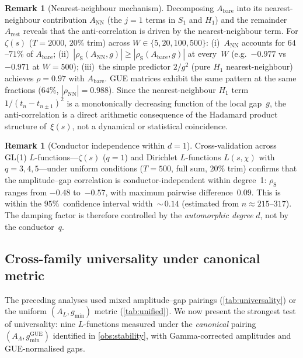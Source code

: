 \documentclass[11pt,a4paper]{article}
\theoremstyle{plain}
\theoremstyle{definition}
\newtheorem{remark}[theorem]{Remark}
\DeclareMathOperator{\GUE}{GUE}
\newcommand{\La}{\Lambda}
\begin{document}
\begin{remark}[Nearest-neighbour mechanism]\label{rem:nn_mechanism}
Decomposing $A_{\mathrm{bare}}$ into its nearest-neighbour contribution
$A_{\mathrm{NN}}$ (the $j{=}1$ terms in $S_1$ and $H_1$) and the
remainder $A_{\mathrm{rest}}$ reveals that the anti-correlation
is driven by the nearest-neighbour term.
For $\zeta(s)$ ($T = 2000$, $20\%$ trim) across
$W \in \{5, 20, 100, 500\}$:
(i)~$A_{\mathrm{NN}}$ accounts for $64$--$71\%$ of $A_{\mathrm{bare}}$;
(ii)~$|\rho_{\mathrm{S}}(A_{\mathrm{NN}}, g)| \ge
|\rho_{\mathrm{S}}(A_{\mathrm{bare}}, g)|$ at every~$W$
(e.g.\ $-0.977$ vs $-0.971$ at $W{=}500$);
(iii)~the simple predictor $2/g^2$ (pure $H_1$ nearest-neighbour)
achieves $\rho = 0.97$ with $A_{\mathrm{bare}}$.
GUE matrices exhibit the same pattern at the same fractions
($64\%$, $|\rho_{\mathrm{NN}}|{=}0.988$).
Since the nearest-neighbour $H_1$ term $1/(t_n{-}t_{n\pm 1})^2$
is a monotonically decreasing function of the local gap~$g$,
the anti-correlation is a direct arithmetic consequence of the
Hadamard product structure of~$\xi(s)$, not a dynamical or
statistical coincidence.
\end{remark}

\begin{remark}[Conductor independence within $d = 1$]\label{rem:conductor_indep}
Cross-validation across GL(1) $L$-functions---$\zeta(s)$
($q = 1$) and Dirichlet $L$-functions $L(s,\chi)$ with
$q = 3, 4, 5$---under uniform conditions
($T = 500$, full sum, $20\%$ trim) confirms that the
amplitude--gap correlation is conductor-independent
within degree~1: $\rho_{\mathrm{S}}$ ranges from $-0.48$
to~$-0.57$, with maximum pairwise difference~$0.09$.
This is within the $95\%$~confidence interval width~${\sim}\,0.14$
(estimated from $n \approx 215$--$317$).
The damping factor is therefore controlled by the
\emph{automorphic degree} $d$, not by the conductor~$q$.
\end{remark}

\subsection{Cross-family universality under canonical metric}
\label{ssec:canonical_cross}

The preceding analyses used mixed amplitude--gap pairings
(\cref{tab:universality}) or the uniform $(A_L, g_{\min})$ metric
(\cref{tab:unified}).  We now present the strongest test of
universality: nine $L$-functions measured under the
\emph{canonical} pairing $(A_\La, g_{\min}^{\GUE})$ identified
in \cref{obs:stability}, with Gamma-corrected amplitudes and
GUE-normalised gaps.
\end{document}
